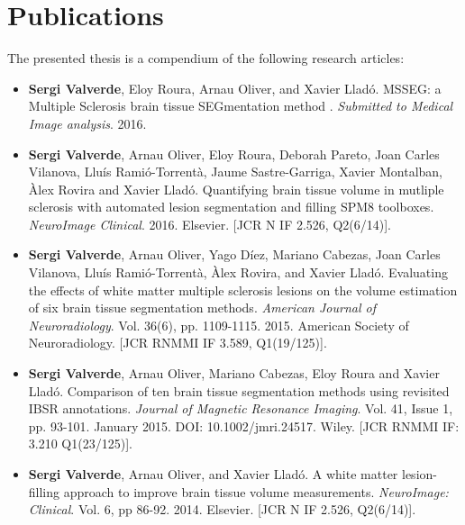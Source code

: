 
\chapter*{Publications}


The presented thesis is a compendium of the following research articles:

\begin{itemize}

\item  \textbf{Sergi Valverde}, Eloy Roura, Arnau Oliver, and Xavier Llad\'o. MSSEG: a Multiple Sclerosis brain tissue SEGmentation method . \textit{Submitted to Medical Image analysis}. 2016. 

\item \textbf{Sergi Valverde}, Arnau Oliver, Eloy Roura, Deborah Pareto, Joan Carles Vilanova, Llu\'{i}s Rami\'{o}-Torrent\`{a}, Jaume Sastre-Garriga, Xavier Montalban, \`{A}lex Rovira and Xavier Llad\'{o}. Quantifying brain tissue volume in mutliple sclerosis with automated lesion segmentation and filling SPM8 toolboxes. \textit{NeuroImage Clinical}. 2016. Elsevier. [JCR N IF 2.526, Q2(6/14)].

\item  \textbf{Sergi Valverde}, Arnau Oliver, Yago D\'{i}ez, Mariano Cabezas, Joan Carles Vilanova, Llu\'{i}s Rami\'{o}-Torrent\`{a}, \`{A}lex Rovira, and Xavier Llad\'o. Evaluating the effects of white matter multiple sclerosis lesions on the volume estimation of six brain tissue segmentation methods. \textit{American Journal of Neuroradiology}. Vol. 36(6), pp. 1109-1115. 2015. American Society of Neuroradiology. [JCR RNMMI IF 3.589, Q1(19/125)].

\item \textbf{Sergi Valverde}, Arnau Oliver, Mariano Cabezas, Eloy Roura and Xavier Llad\'{o}. Comparison of ten brain tissue segmentation methods using revisited IBSR annotations. \textit{Journal of Magnetic Resonance Imaging}. Vol. 41, Issue 1, pp. 93-101. January 2015. DOI: 10.1002/jmri.24517. Wiley. [JCR RNMMI IF: 3.210 Q1(23/125)].

\item  \textbf{Sergi Valverde}, Arnau Oliver, and Xavier Llad\'o. A white matter lesion-filling approach to improve brain tissue volume measurements. \textit{NeuroImage: Clinical}. Vol. 6, pp 86-92. 2014. Elsevier. [JCR N IF 2.526, Q2(6/14)].


\end{itemize}



